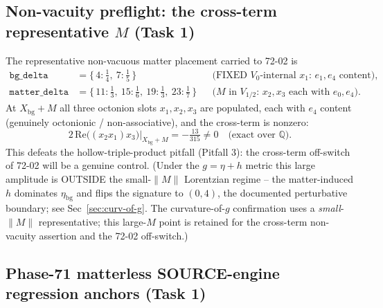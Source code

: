 \subsection{Non-vacuity preflight: the cross-term representative $M$ (Task 1)}
\label{sec:nonvacuity}

The representative non-vacuous matter placement carried to 72-02 is
\begin{align}
  \texttt{bg\_delta} &= \{\,4{:}\tfrac14,\ 7{:}\tfrac15\,\}
    &&\text{(FIXED $V_0$-internal $x_1$: $e_1,e_4$ content),}\\
  \texttt{matter\_delta} &= \{\,11{:}\tfrac13,\ 15{:}\tfrac16,\ 19{:}\tfrac13,\ 23{:}\tfrac17\,\}
    &&\text{($M$ in $V_{1/2}$: $x_2,x_3$ each with $e_0,e_4$).}
\end{align}
At $X_{\mathrm{bg}}+M$ all three octonion slots $x_1,x_2,x_3$ are populated, each with
$e_4$ content (genuinely octonionic / non-associative), and the cross-term is nonzero:
\begin{equation}
  2\,\mathrm{Re}\big((x_2 x_1)x_3\big)\Big|_{X_{\mathrm{bg}}+M} = -\tfrac{13}{315}\neq 0
  \quad\text{(exact over $\mathbb{Q}$).}
\end{equation}
This defeats the hollow-triple-product pitfall (Pitfall 3): the cross-term off-switch
of 72-02 will be a genuine control. (Under the $g=\eta+h$ metric this large amplitude
is OUTSIDE the small-$\|M\|$ Lorentzian regime -- the matter-induced $h$ dominates
$\eta_{\mathrm{bg}}$ and flips the signature to $(0,4)$, the documented perturbative
boundary; see Sec~\ref{sec:curv-of-g}. The curvature-of-$g$ confirmation uses a
\emph{small}-$\|M\|$ representative; this large-$M$ point is retained for the
cross-term non-vacuity assertion and the 72-02 off-switch.)

\subsection{Phase-71 matterless SOURCE-engine regression anchors (Task 1)}
\label{sec:regression}

